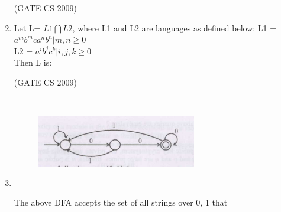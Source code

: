 \documentclass[a4paper, 11pt]{article}
\begin{document}
\begin{enumerate}
    \hfill (GATE CS 2009)

    \item  Let L= $L1\bigcap L2$, where L1 and L2 are languages as defined below:
    L1 = {$a^m b^m c a^n b^n | m,n \geq0$}\\
    L2 = {$a^i b^j c^k| i,j,k \geq0$}\\
    Then L is:\\

    \begin{enumerate}
    \end{enumerate}

    \hfill (GATE CS 2009)
    
    \item
    \begin{figure}[H]
        \centering
        \includegraphics[width=7cm, height= 4cm]{figs/q41.png}
        \caption{}
        \label{fig:placeholder}
    \end{figure}
        
    The above DFA accepts the set of all strings over {0, 1} that\\
    \begin{enumerate}
    \end{enumerate}


\end{enumerate}
\end{document}
